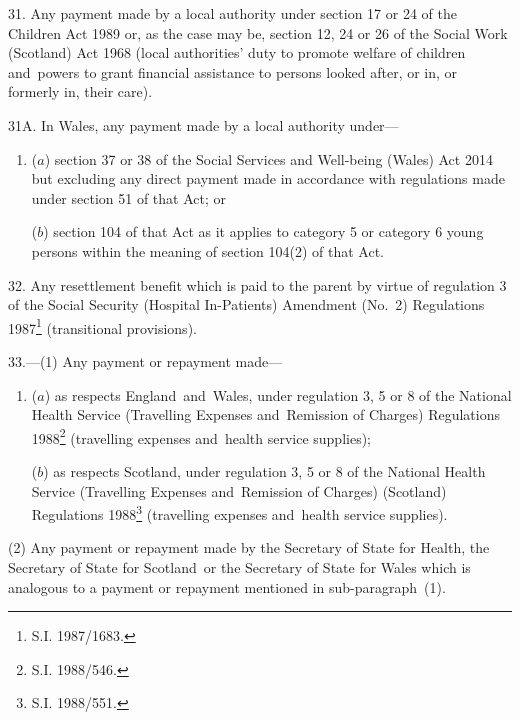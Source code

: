 \documentclass[12pt,a4paper]{article}
\begin{document}
\medskip

31.  Any payment made by a local authority under section 17 or 24 of the Children Act 1989 or, as the case may be, section 12, 24 or 26 of the Social Work (Scotland) Act 1968 (local authorities' duty to promote welfare of children and~powers to grant financial assistance to persons looked after, or in, or formerly in, their care).

\medskip

31A.  In Wales, any payment made by a local authority under—
\begin{enumerate}
\item []
($a$) section 37 or 38 of the Social Services and Well-being (Wales) Act 2014 but excluding any direct payment made in accordance with regulations made under section 51 of that Act; or

($b$) section 104 of that Act as it applies to category 5 or category 6 young persons within the meaning of section 104(2) of that Act.
\end{enumerate}


\medskip

32.  Any resettlement benefit which is paid to the parent by virtue of regulation 3 of the Social Security (Hospital In-Patients) Amendment (No.\ 2) Regulations 1987\footnote{\frenchspacing S.I. 1987/1683.} (transitional provisions).

\medskip

33.—(1) Any payment or repayment made—
\begin{enumerate}\item[]
($a$) as respects England~and~Wales, under regulation 3, 5 or 8 of the National Health Service (Travelling Expenses and~Remission of Charges) Regulations 1988\footnote{\frenchspacing S.I. 1988/546.} (travelling expenses and~health service supplies);

($b$) as respects Scotland, under regulation 3, 5 or 8 of the National Health Service (Travelling Expenses and~Remission of Charges) (Scotland) Regulations 1988\footnote{\frenchspacing S.I. 1988/551.} (travelling expenses and~health service supplies).
\end{enumerate}

(2) Any payment or repayment made by the Secretary of State for Health, the Secretary of State for Scotland~or the Secretary of State for Wales which is analogous to a payment or repayment mentioned in sub-paragraph~(1).
\end{document}
